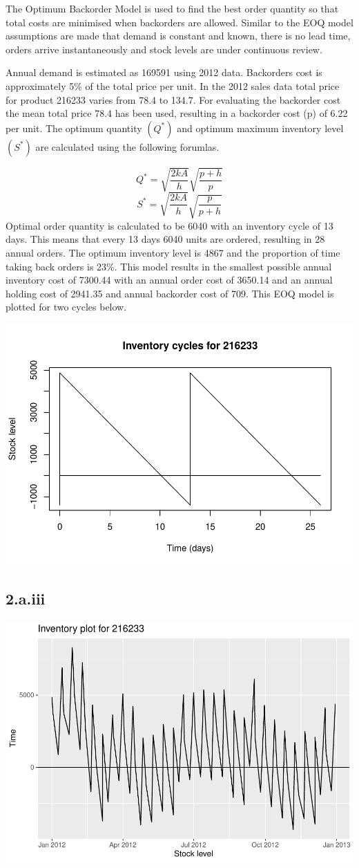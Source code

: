 \documentclass[
  11pt,
]{article}
\begin{document}
The Optimum Backorder Model is used to find the best order quantity so
that total costs are minimised when backorders are allowed. Similar to
the EOQ model assumptions are made that demand is constant and known,
there is no lead time, orders arrive instantaneously and stock levels
are under continuous review.

Annual demand is estimated as 169591 using 2012 data. Backorders cost is
approximately 5\% of the total price per unit. In the 2012 sales data
total price for product 216233 varies from 78.4 to 134.7. For evaluating
the backorder cost the mean total price 78.4 has been used, resulting in
a backorder cost (p) of 6.22 per unit. The optimum quantity \((Q^*)\)
and optimum maximum inventory level \((S^*)\) are calculated using the
following forumlas.

\[Q^* = \sqrt{\frac{2kA}{h}} \sqrt{\frac{p+h}{p}} \]
\[S^* = \sqrt{\frac{2kA}{h}} \sqrt{\frac{p}{p+h}} \] Optimal order
quantity is calculated to be 6040 with an inventory cycle of 13 days.
This means that every 13 days 6040 units are ordered, resulting in 28
annual orders. The optimum inventory level is 4867 and the proportion of
time taking back orders is 23\%. This model results in the smallest
possible annual inventory cost of 7300.44 with an annual order cost of
3650.14 and an annual holding cost of 2941.35 and annual backorder cost
of 709. This EOQ model is plotted for two cycles below.

\includegraphics[width=0.75\linewidth]{Assignment-STAT702---final_files/figure-latex/2aii plot-1}

\hypertarget{a.iii}{%
\subsection{2.a.iii}\label{a.iii}}

\includegraphics[width=0.75\linewidth]{Assignment-STAT702---final_files/figure-latex/2aiii-1}
\end{document}
